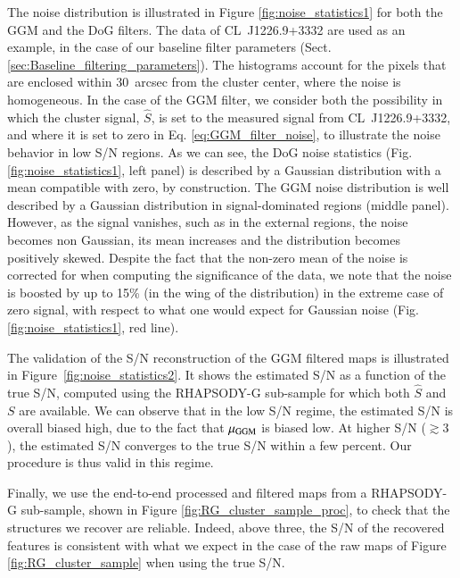\documentclass[traditabstract]{aa}
\begin{document}
The noise distribution is illustrated in Figure \ref{fig:noise_statistics1} for both the GGM and the DoG filters. The data of \mbox{CL~J1226.9+3332} are used as an example, in the case of our baseline filter parameters (Sect. \ref{sec:Baseline_filtering_parameters}). The histograms account for the pixels that are enclosed within 30~arcsec from the cluster center, where the noise is homogeneous. In the case of the GGM filter, we consider both the possibility in which the cluster signal, $\hat{S}$, is set to the measured signal from \mbox{CL~J1226.9+3332}, and where it is set to zero in Eq. \ref{eq:GGM_filter_noise}, to illustrate the noise behavior in low S/N regions. As we can see, the DoG noise statistics (Fig. \ref{fig:noise_statistics1}, left panel) is described by a Gaussian distribution with a mean compatible with zero, by construction. The GGM noise distribution is well described by a Gaussian distribution in signal-dominated regions (middle panel). However, as the signal vanishes, such as in the external regions, the noise becomes non Gaussian, its mean increases and the distribution becomes positively skewed. Despite the fact that the non-zero mean of the noise is corrected for when computing the significance of the data, we note that the noise is boosted by up to 15\% (in the wing of the distribution) in the extreme case of zero signal, with respect to what one would expect for Gaussian noise (Fig. \ref{fig:noise_statistics1}, red line).

The validation of the S/N reconstruction of the GGM filtered maps is illustrated in Figure~\ref{fig:noise_statistics2}. It shows the estimated S/N as a function of the true S/N, computed using the RHAPSODY-G sub-sample for which both $\hat{S}$ and $S$ are available. We can observe that in the low S/N regime, the estimated S/N is overall biased high, due to the fact that $\mu_{\rm GGM}$ is biased low. At higher S/N ($\gtrsim 3$), the estimated S/N converges to the true S/N within a few percent. Our procedure is thus valid in this regime.

Finally, we use the end-to-end processed and filtered maps from a RHAPSODY-G sub-sample, shown in Figure \ref{fig:RG_cluster_sample_proc}, to check that the structures we recover are reliable. Indeed, above three, the S/N of the recovered features is consistent with what we expect in the case of the raw maps of Figure \ref{fig:RG_cluster_sample} when using the true S/N.
\end{document}

